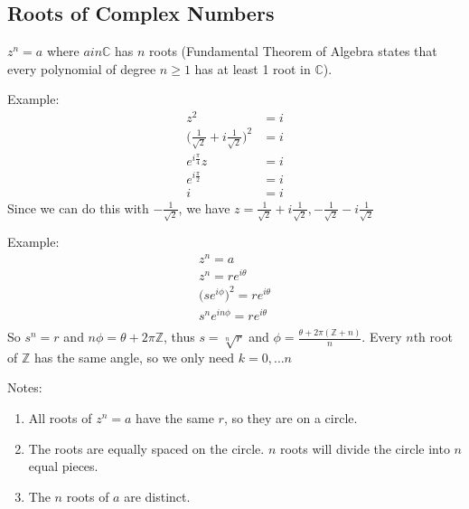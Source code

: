 \documentclass[12pt]{article}
\begin{document}
\subsection*{Roots of Complex Numbers}
$z^n = a$ where $a in \mathbb{C}$ has $n$ roots (Fundamental Theorem of Algebra states that every polynomial of degree $n \geq 1$ has at least 1 root in $\mathbb{C}$).

Example:
\begin{align*}
z^2 &= i\\
\bigg(\frac{1}{\sqrt{2}} + i\frac{1}{\sqrt{2}}\bigg)^2 &= i\\
e^{i\frac{\pi}{4}}z &= i\\
e^{i\frac{\pi}{2}} &= i\\
i &= i
\end{align*}
Since we can do this with $-\frac{1}{\sqrt{2}}$, we have $z = \frac{1}{\sqrt{2}} + i\frac{1}{\sqrt{2}}, -\frac{1}{\sqrt{2}} - i\frac{1}{\sqrt{2}}$

Example:
\begin{align*}
z^n = a\\
z^n = re^{i\theta}\\
\bigl(se^{i\phi}\bigl)^2 = re^{i\theta}\\
s^ne^{in\phi} = re^{i\theta}\\
\end{align*}
So $s^n = r$ and $n\phi = \theta + 2\pi\mathbb{Z}$, thus $s = \sqrt[n]{r}$ and $\phi = \frac{\theta + 2\pi(\mathbb{Z}+n)}{n}$. Every $n$th root of $\mathbb{Z}$ has the same angle, so we only need $k = 0,\dots n$

Notes:
\begin{enumerate}
\item All roots of $z^n =a$ have the same $r$, so they are on a circle.
\item The roots are equally spaced on the circle. $n$ roots will divide the circle into $n$ equal pieces.
\item The $n$ roots of $a$ are distinct.
\end{enumerate}
\end{document}
